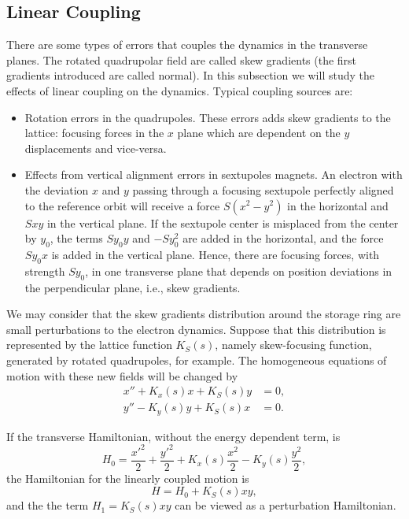 \subsection{Linear Coupling}\label{subsec:linear_coupling}
There are some types of errors that couples the dynamics in the transverse planes. The rotated quadrupolar field are called skew gradients (the first gradients introduced are called normal). In this subsection we will study the effects of linear coupling on the dynamics. Typical coupling sources are:
\begin{itemize}
    \item Rotation errors in the quadrupoles. These errors adds skew gradients to the lattice: focusing forces in the $x$ plane which are dependent on the $y$ displacements and vice-versa.
    \item Effects from vertical alignment errors in sextupoles magnets. An electron with the deviation $x$ and $y$ passing through a focusing sextupole perfectly aligned to the reference orbit will receive a force $S(x^2-y^2)$ in the horizontal and $Sxy$ in the vertical plane. If the sextupole center is misplaced from the center by $y_0$, the terms $Sy_0 y$ and $-Sy_0^2$ are added in the horizontal, and the force $Sy_0 x$ is added in the vertical plane. Hence, there are focusing forces, with strength $Sy_0$, in one transverse plane that depends on position deviations in the perpendicular plane, i.e., skew gradients.
\end{itemize}

We may consider that the skew gradients distribution around the storage ring are small perturbations to the electron dynamics. Suppose that this distribution is represented by the lattice function $K_S(s)$, namely skew-focusing function, generated by rotated quadrupoles, for example. The homogeneous equations of motion with these new fields will be changed by
\begin{align}
    x'' + K_x(s) x + K_S(s)y &=0, \\
    y'' - K_y(s) y + K_S(s)x &=0.
\end{align}

If the transverse Hamiltonian, without the energy dependent term, is 
\begin{equation*}
H_0 = \dfrac{{x'}^2}{2} + \dfrac{{y'}^2}{2} + K_x(s)\dfrac{{x}^2}{2} - K_y(s) \frac{y^2}{2},    
\end{equation*}
the Hamiltonian for the linearly coupled motion is 
\begin{equation*}
    H = H_0 + K_S(s) xy,
\end{equation*}
and the the term $H_1 = K_S(s) xy$ can be viewed as a perturbation Hamiltonian.

